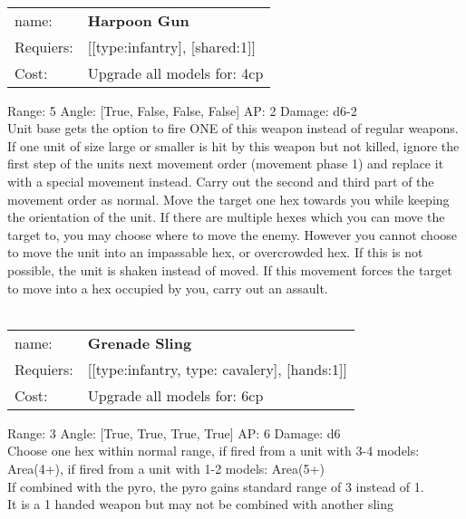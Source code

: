 \ \\
\begin{tabular}{ll}
name: & {\bf Harpoon Gun } \\
Requiers: & [[type:infantry], [shared:1]] \\
Cost: & Upgrade all models for: 4cp \\
\end{tabular}



Range: 5  Angle: [True, False, False, False] AP: 2 Damage: d6-2 \\
Unit base gets the option to fire ONE of this weapon instead of regular weapons.\\ 
If one unit of size large or smaller is hit by this weapon but not killed, ignore the first step of the units next movement order (movement phase 1) and replace it with a special movement instead. Carry out the second and third part of the movement order as normal. Move the target one hex towards you while keeping the orientation of the unit. If there are multiple hexes which you can move the target to, you may choose where to move the enemy. However you cannot choose to move the unit into an impassable hex, or overcrowded hex. If this is not possible, the unit is shaken instead of moved. If this movement forces the target to move into a hex occupied by you, carry out an assault.\\ 








\ \\
\begin{tabular}{ll}
name: & {\bf Grenade Sling } \\
Requiers: & [[type:infantry, type: cavalery], [hands:1]] \\
Cost: & Upgrade all models for: 6cp \\
\end{tabular}



Range: 3  Angle: [True, True, True, True] AP: 6 Damage: d6 \\
Choose one hex within normal range, if fired from a unit with 3-4 models: Area(4+), if fired from a unit with 1-2 models: Area(5+)\\ 
If combined with the pyro, the pyro gains standard range of 3 instead of 1.\\ 
It is a 1 handed weapon but may not be combined with another sling\\ 








